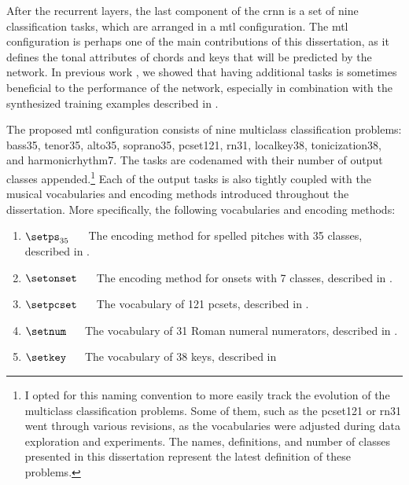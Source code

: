 
After the recurrent layers, the last component of the
\gls{crnn} is a set of nine classification tasks, which are
arranged in a \gls{mtl} configuration. The \gls{mtl}
configuration is perhaps one of the main contributions of
this dissertation, as it defines the tonal attributes of
chords and keys that will be predicted by the network. In
previous work \parencite{napoleslopez2021augmentednet}, we
showed that having additional tasks is sometimes beneficial
to the performance of the network, especially in combination
with the synthesized training examples described in
.

The proposed \gls{mtl} configuration consists of nine
multiclass classification problems: \gls{bass35},
\gls{tenor35}, \gls{alto35}, \gls{soprano35},
\gls{pcset121}, \gls{rn31}, \gls{localkey38},
\gls{tonicization38}, and \gls{harmonicrhythm7}. The tasks
are codenamed with their number of output classes
appended.\footnote{I opted for this naming convention to
more easily track the evolution of the multiclass
classification problems. Some of them, such as the
\gls{pcset121} or \gls{rn31} went through various revisions,
as the vocabularies were adjusted during data exploration
and experiments. The names, definitions, and number of
classes presented in this dissertation represent the latest
definition of these problems.} Each of the output tasks is
also tightly coupled with the musical vocabularies and
encoding methods introduced throughout the dissertation.
More specifically, the following vocabularies and encoding
methods:

\begin{enumerate}
    \item[] $\setps_{35}$ $\quad$ The encoding method for spelled
    pitches with 35 classes, described in
    .
    \item[] $\setonset$ $\quad$ The encoding method for onsets
    with 7 classes, described in
    .
    \item[] $\setpcset$ $\quad$ The vocabulary of 121
    \gls{pcset}s, described in
    .
    \item[] $\setnum$ $\quad$ The vocabulary of 31 Roman numeral
    numerators, described in
    .
    \item[] $\setkey$ $\quad$ The vocabulary of 38 keys, described
    in
\end{enumerate}

